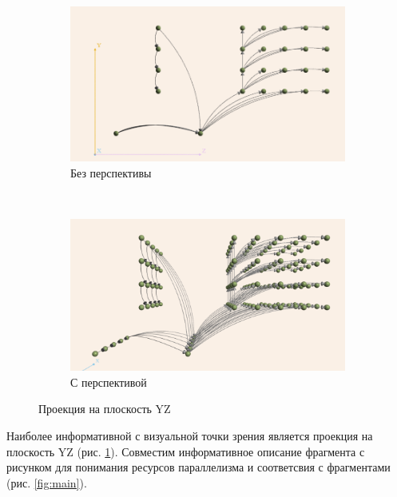 \documentclass[12pt, fleqn]{article}
\theoremstyle{definition}
\begin{document}
\begin{figure}[ht]
\begin{subfigure}{\textwidth}
 \begin{center}
 \includegraphics[scale=0.94]{YZ_proj.png}
 \caption{Без перспективы}
\end{center}
\end{subfigure}\\
\begin{subfigure}{\textwidth}
 \begin{center}
 \includegraphics[scale=0.77]{YZ_persp.png}
 \caption{С перспективой}
\end{center}
\end{subfigure}
\caption{Проекция на плоскость YZ}
\label{fig:YZ}
\end{figure}

Наиболее информативной с визуальной точки зрения является проекция на плоскость YZ (рис. \ref{fig:YZ}). Совместим информативное описание фрагмента с рисунком для понимания ресурсов параллелизма и соответсвия с фрагментами (рис. \ref{fig:main}).
\end{document}
